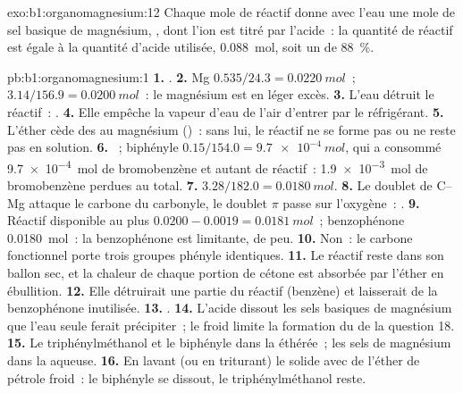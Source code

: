 \begin{solution}{exo:b1:organomagnesium:12}
Chaque mole de réactif donne avec l'eau une mole de sel basique de
magnésium, , dont l'ion  est
titré par l'acide~: la quantité de réactif est égale à la quantité
d'acide utilisée, \qty{0.088}{mol}, soit un  de
\qty{88}{\percent}.
\end{solution}

\begin{solution}{pb:b1:organomagnesium:1}
\textbf{1.} .
\textbf{2.} Mg $0.535/24.3 = \qty{0.0220}{mol}$~;  $3.14/156.9 =
\qty{0.0200}{mol}$~: le magnésium est en léger excès.
\textbf{3.} L'eau détruit le réactif~: .
\textbf{4.} Elle empêche la vapeur d'eau de l'air d'entrer par le
réfrigérant.
\textbf{5.} L'éther cède des  au magnésium ()~: sans lui, le réactif ne se forme pas ou ne reste pas en
solution.
\textbf{6.} ~; biphényle
$0.15/154.0 = \qty{9.7e-4}{mol}$, qui a consommé \qty{9.7e-4}{mol} de
bromobenzène et autant de réactif~: \qty{1.9e-3}{mol} de bromobenzène
perdues au total.
\textbf{7.} $3.28/182.0 = \qty{0.0180}{mol}$.
\textbf{8.} Le doublet de C--Mg attaque le carbone du carbonyle, le
doublet $\pi$ passe sur l'oxygène~:  .
\textbf{9.} Réactif disponible au plus $0.0200 - 0.0019 = \qty{0.0181}{mol}$~;
benzophénone \qty{0.0180}{mol}~: la benzophénone est limitante, de peu.
\textbf{10.} Non~: le carbone fonctionnel porte trois groupes phényle
identiques.
\textbf{11.} Le réactif reste dans son ballon sec, et la chaleur de
chaque portion de cétone est absorbée par l'éther en ébullition.
\textbf{12.} Elle détruirait une partie du réactif (benzène) et
laisserait de la benzophénone inutilisée.
\textbf{13.} .
\textbf{14.} L'acide dissout les sels basiques de magnésium que l'eau
seule ferait précipiter~; le froid limite la formation du 
de la question 18.
\textbf{15.} Le triphénylméthanol et le biphényle dans la 
éthérée~; les sels de magnésium dans la  aqueuse.
\textbf{16.} En lavant (ou en triturant) le solide avec de l'éther de
pétrole froid~: le biphényle se dissout, le triphénylméthanol reste.

\end{solution}
